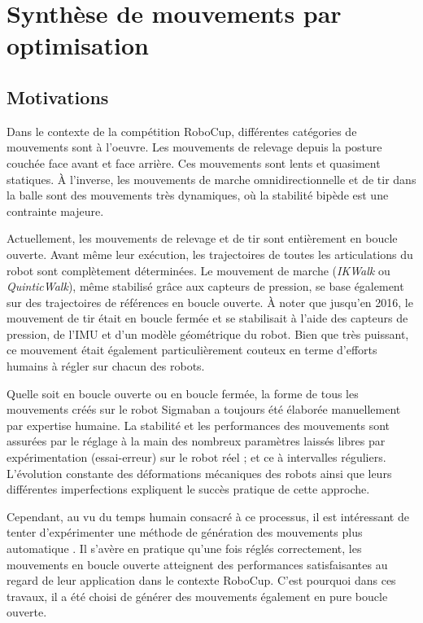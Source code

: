 
\section{Synthèse de mouvements par optimisation\label{sec:motion_generation}}

\subsection{Motivations}

Dans le contexte de la compétition RoboCup, différentes catégories de
mouvements sont à l'oeuvre. Les mouvements de relevage depuis
la posture couchée face avant et face arrière.
Ces mouvements sont lents et quasiment statiques.
À l'inverse, les mouvements de marche omnidirectionnelle et 
de tir dans la balle sont des mouvements très dynamiques,
où la stabilité bipède est une contrainte majeure.

Actuellement, les mouvements de relevage et de tir 
sont entièrement en boucle ouverte. 
Avant même leur exécution, les trajectoires de 
toutes les articulations du robot sont complètement déterminées.
Le mouvement de marche (\textit{IKWalk} ou \textit{QuinticWalk}),
même stabilisé grâce aux capteurs de pression, se base
également sur des trajectoires de références en boucle ouverte.
À noter que jusqu'en 2016, le mouvement de tir était en boucle fermée et 
se stabilisait à l'aide des capteurs de pression, de l'IMU et d'un 
modèle géométrique du robot.
Bien que très puissant, ce mouvement était également particulièrement 
couteux en terme d'efforts humains à régler sur chacun des robots.

Quelle soit en boucle ouverte ou en boucle fermée, la forme de 
tous les mouvements créés sur le robot Sigmaban a toujours 
été élaborée manuellement par \og expertise \fg humaine.
La stabilité et les performances des mouvements sont assurées
par le réglage à la main des nombreux paramètres laissés libres
par expérimentation (essai-erreur) sur le robot réel ; 
et ce à intervalles réguliers.
L'évolution constante des déformations mécaniques des robots ainsi que
leurs différentes imperfections expliquent le succès pratique 
de cette approche.

Cependant, au vu du temps humain consacré à ce processus, 
il est intéressant de tenter d'expérimenter une méthode de 
génération des mouvements plus \og automatique \fg.
Il s'avère en pratique qu'une fois réglés correctement, 
les mouvements en boucle ouverte atteignent des performances satisfaisantes
au regard de leur application dans le contexte RoboCup.
C'est pourquoi dans ces travaux, il a été choisi de générer 
des mouvements également en pure boucle ouverte.\\

